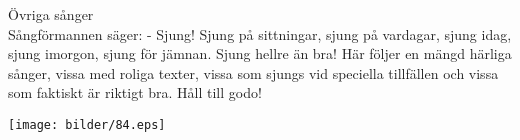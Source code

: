 \begin{flushleft}
{\Huge Övriga sånger\\}
\vspace{1cm}
{\Large
Sångförmannen säger:
- Sjung! Sjung på sittningar, sjung på vardagar, sjung idag, sjung
imorgon, sjung för jämnan. Sjung hellre än bra! Här följer en mängd härliga sånger, vissa
med roliga texter, vissa som sjungs vid speciella tillfällen och vissa
som faktiskt är riktigt bra. Håll till godo! 
}
\end{flushleft}

\begin{center}
\vspace{2cm}
\texttt{[image: bilder/84.eps]}
\end{center}

\newpage


\newpage


\newpage
{}

\newpage





\newpage



\newpage


\newpage


\newpage


\newpage



\newpage

\newpage





